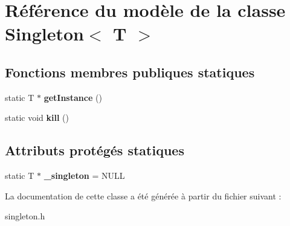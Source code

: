 \hypertarget{class_singleton}{\section{Référence du modèle de la classe Singleton$<$ T $>$}
\label{class_singleton}
}
\subsection*{Fonctions membres publiques statiques}
\begin{DoxyCompactItemize}
\item 
\hypertarget{class_singleton_ad6f103597095efda360db4a230308666}{static T $\ast$ {\bfseries get\+Instance} ()}\label{class_singleton_ad6f103597095efda360db4a230308666}

\item 
\hypertarget{class_singleton_ac2686bdea2194fe911e68c5765924d7a}{static void {\bfseries kill} ()}\label{class_singleton_ac2686bdea2194fe911e68c5765924d7a}

\end{DoxyCompactItemize}
\subsection*{Attributs protégés statiques}
\begin{DoxyCompactItemize}
\item 
\hypertarget{class_singleton_a13a24bdde309c713f98d86413f4c3f43}{static T $\ast$ {\bfseries \+\_\+singleton} = N\+U\+L\+L}\label{class_singleton_a13a24bdde309c713f98d86413f4c3f43}

\end{DoxyCompactItemize}


La documentation de cette classe a été générée à partir du fichier suivant \+:\begin{DoxyCompactItemize}
\item 
singleton.\+h\end{DoxyCompactItemize}
